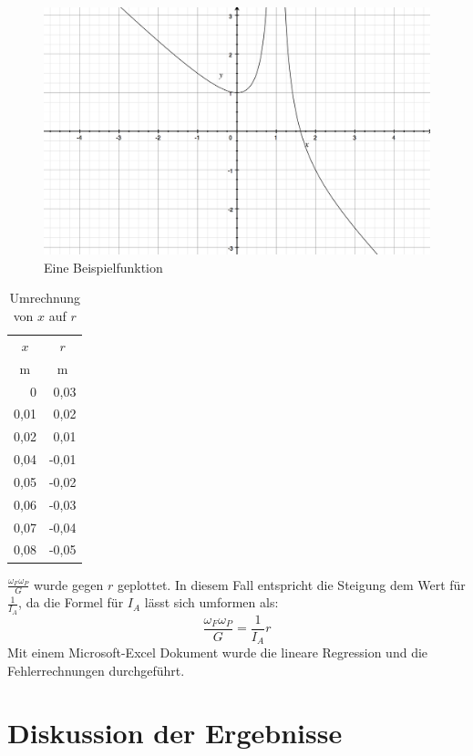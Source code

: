 \documentclass[11pt,a4paper]{article} %
\begin{document}
\begin{figure}
	\centering
	\includegraphics[width=\linewidth]{Abb2}
	\caption{Eine Beispielfunktion}
\end{figure}

\begin{table}[h]
	\centering
	\begin{tabular*}{0.15\textwidth}{@{\extracolsep{\fill}}rr}
		\toprule
		\multicolumn{1}{c}{$x$} & \multicolumn{1}{c}{$r$}\\
		\multicolumn{1}{c}{m} & \multicolumn{1}{c}{m} \\
		\midrule
		0 &  0,03\\
		0,01 &  0,02\\
		0,02 &  0,01\\
		0,04 & -0,01\\
		0,05 & -0,02\\
		0,06 & -0,03\\
		0,07 & -0,04\\ 
		0,08 & -0,05\\
		\bottomrule
	\end{tabular*}
	\caption{Umrechnung von $x$ auf $r$}
	\label{tabelle}
\end{table}

$\frac{\omega_F\omega_P}{G}$ wurde gegen $r$ geplottet. In diesem Fall entspricht die Steigung dem Wert für $\frac{1}{I_A}$, da die Formel für $I_A$ lässt sich umformen als:
$$\frac{\omega_F\omega_P}{G} = \frac{1}{I_A}r$$ 
Mit einem Microsoft-Excel Dokument wurde die lineare Regression und die Fehlerrechnungen durchgeführt. 

\section{Diskussion der Ergebnisse}
\end{document}

